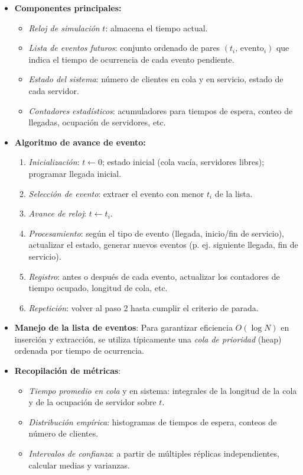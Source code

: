 \documentclass{article}
\begin{document}
\begin{itemize}
    \item \textbf{Componentes principales:}
    \begin{itemize}
        \item \emph{Reloj de simulación} \(t\): almacena el tiempo actual.
        \item \emph{Lista de eventos futuros}: conjunto ordenado de pares \((t_i,\,\text{evento}_i)\) que indica el tiempo de ocurrencia de cada evento pendiente.
        \item \emph{Estado del sistema}: número de clientes en cola y en servicio, estado de cada servidor.
        \item \emph{Contadores estadísticos}: acumuladores para tiempos de espera, conteo de llegadas, ocupación de servidores, etc.
    \end{itemize}

    \item \textbf{Algoritmo de avance de evento:}
    \begin{enumerate}
        \item \emph{Inicialización}: \(t\gets0\); estado inicial (cola vacía, servidores libres); programar llegada inicial.
        \item \emph{Selección de evento}: extraer el evento con menor \(t_i\) de la lista.
        \item \emph{Avance de reloj}: \(t \gets t_i\).
        \item \emph{Procesamiento}: según el tipo de evento (llegada, inicio/fin de servicio), actualizar el estado, generar nuevos eventos (p. ej. siguiente llegada, fin de servicio).
        \item \emph{Registro}: antes o después de cada evento, actualizar los contadores de tiempo ocupado, longitud de cola, etc.
        \item \emph{Repetición}: volver al paso 2 hasta cumplir el criterio de parada.
    \end{enumerate}

    \item \textbf{Manejo de la lista de eventos}:  
    Para garantizar eficiencia \(O(\log N)\) en inserción y extracción, se utiliza típicamente una \emph{cola de prioridad} (heap) ordenada por tiempo de ocurrencia.

    \item \textbf{Recopilación de métricas}:  
    \begin{itemize}
        \item \emph{Tiempo promedio en cola} y en sistema: integrales de la longitud de la cola y de la ocupación de servidor sobre \(t\).
        \item \emph{Distribución empírica}: histogramas de tiempos de espera, conteos de número de clientes.
        \item \emph{Intervalos de confianza}: a partir de múltiples réplicas independientes, calcular medias y varianzas.
    \end{itemize}


\end{itemize}
\end{document}
